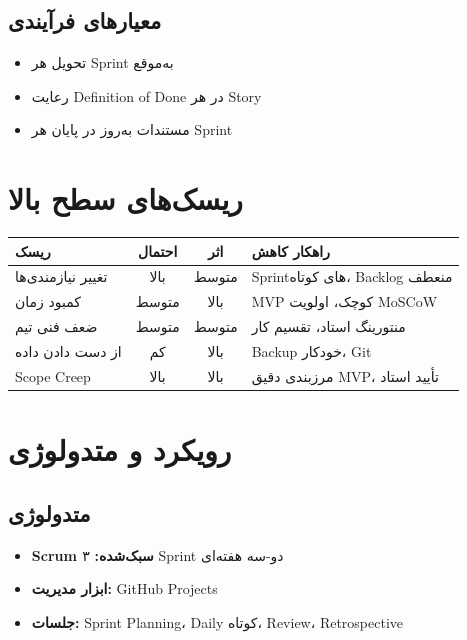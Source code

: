 \documentclass[12pt, a4paper]{article}
\begin{document}
\subsection{معیارهای فرآیندی}
\begin{itemize}
    \item تحویل هر Sprint به‌موقع
    \item رعایت Definition of Done در هر Story
    \item مستندات به‌روز در پایان هر Sprint
\end{itemize}

\section{ریسک‌های سطح بالا}

\begin{center}
\begin{tabular}{|p{4cm}|c|c|p{4cm}|}
\hline
\textbf{ریسک} & \textbf{احتمال} & \textbf{اثر} & \textbf{راهکار کاهش} \\
\hline
تغییر نیازمندی‌ها & بالا & متوسط & Sprintهای کوتاه، Backlog منعطف \\
\hline
کمبود زمان & متوسط & بالا & MVP کوچک، اولویت MoSCoW \\
\hline
ضعف فنی تیم & متوسط & متوسط & منتورینگ استاد، تقسیم کار \\
\hline
از دست دادن داده & کم & بالا & Backup خودکار، Git \\
\hline
Scope Creep & بالا & بالا & مرزبندی دقیق MVP، تأیید استاد \\
\hline
\end{tabular}
\end{center}

\section{رویکرد و متدولوژی}

\subsection{متدولوژی}
\begin{itemize}
    \item \textbf{Scrum سبک‌شده:} ۳ Sprint دو-سه هفته‌ای
    \item \textbf{ابزار مدیریت:} GitHub Projects
    \item \textbf{جلسات:} Sprint Planning، Daily کوتاه، Review، Retrospective
\end{itemize}
\end{document}
